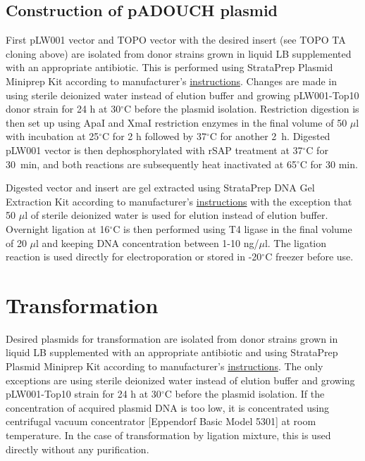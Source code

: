 \subsection{Construction of pADOUCH plasmid}
First pLW001 vector and TOPO vector with the desired insert (see TOPO TA cloning above) are isolated from donor strains grown in liquid LB supplemented with an appropriate antibiotic.
This is performed using StrataPrep Plasmid Miniprep Kit according to manufacturer's \href{https://www.agilent.com/cs/library/usermanuals/public/400766.pdf}{instructions}.
Changes are made in using sterile deionized water instead of elution buffer and growing pLW001-Top10 donor strain for 24 h at 30$^{\circ}$C before the plasmid isolation.
Restriction digestion is then set up using ApaI and XmaI restriction enzymes in the final volume of 50 $\mu$l with incubation at 25$^{\circ}$C for 2 h followed by 37$^{\circ}$C for another 2~h.
Digested pLW001 vector is then dephosphorylated with rSAP treatment at 37$^{\circ}$C for 30~min, and both reactions are subsequently heat inactivated at 65$^{\circ}$C for 30 min.

Digested vector and insert are gel extracted using StrataPrep DNA Gel Extraction Kit according to manufacturer's \href{https://www.agilent.com/cs/library/usermanuals/public/400766.pdf}{instructions} with the exception that 50 $\mu$l of sterile deionized water is used for elution instead of elution buffer.
Overnight ligation at 16$^{\circ}$C is then performed using T4 ligase in the final volume of 20 $\mu$l and keeping DNA concentration between 1-10 ng/$\mu$l.
The ligation reaction is used directly for electroporation or stored in -20$^{\circ}$C freezer before use.

\section{Transformation}
Desired plasmids for transformation are isolated from donor strains grown in liquid LB supplemented with an appropriate antibiotic and using StrataPrep Plasmid Miniprep Kit according to manufacturer's \href{https://www.agilent.com/cs/library/usermanuals/public/400766.pdf}{instructions}.
The only exceptions are using sterile deionized water instead of elution buffer and growing pLW001-Top10 strain for 24 h at 30$^{\circ}$C before the plasmid isolation.
If the concentration of acquired plasmid DNA is too low, it is concentrated using centrifugal vacuum concentrator [Eppendorf\textsuperscript{\textregistered} Basic Model 5301] at room temperature.
In the case of transformation by ligation mixture, this is used directly without any purification.

